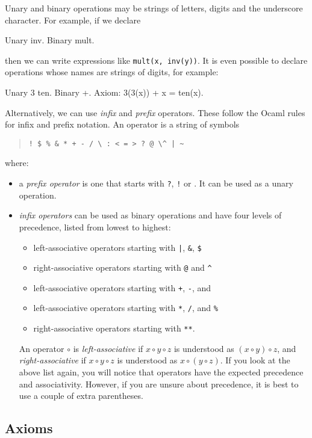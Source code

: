 \documentclass{article}
\begin{document}
Unary and binary operations may be strings of letters, digits and the
underscore character. For example, if we declare
%
\begin{alg}
Unary inv.
Binary mult.
\end{alg}
%
then we can write expressions like \texttt{mult(x, inv(y))}. It is
even possible to declare operations whose names are strings of digits,
for example:
%
\begin{alg}
Unary 3 ten.
Binary +.
Axiom: 3(3(x)) + x = ten(x).
\end{alg}
%
Alternatively, we can use \emph{infix} and \emph{prefix} operators.
These follow the Ocaml rules for infix and prefix notation. An
operator is a string of symbols
%
\begin{quote}
  \verb.! $ % & * + - / \ : < = > ? @ \^ | ~.
\end{quote}
where:
%
\begin{itemize}
\item a \emph{prefix operator} is one that starts with \texttt{?},
  \texttt{!} or \texttt{}. It can be used as a unary operation.
\item \emph{infix operators} can be used as binary operations and have
  four levels of precedence, listed from lowest to highest:
  \begin{itemize}
    \item left-associative operators starting with \texttt{|}, \texttt{\&}, \texttt{\$}
    \item right-associative operators starting with \texttt{@} and \texttt{\^}
    \item left-associative operators starting with \texttt{+}, \texttt{-},
      and \texttt{}
    \item left-associative operators starting with \texttt{*}, \texttt{/}, and \texttt{\%} 
    \item right-associative operators starting with \texttt{**}.
  \end{itemize}
  An operator $\circ$ is \emph{left-associative} if $x \circ y \circ
  z$ is understood as $(x \circ y) \circ z$, and
  \emph{right-associative} if $x \circ y \circ z$ is understood as $x
  \circ (y \circ z)$. If you look at the above list again, you will
  notice that operators have the expected precedence and
  associativity. However, if you are unsure about precedence, it is
  best to use a couple of extra parentheses.
\end{itemize}

\subsection{Axioms}
\end{document}
